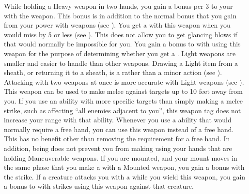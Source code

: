     While holding a Heavy weapon in two hands, you gain a  bonus per 3  to your  with the weapon.
    This bonus is in addition to the normal bonus that you gain from your power with weapons (see ).
     You get a  with this weapon when you would miss by 5 or less (see ).
    This does not allow you to get glancing blows if that would normally be impossible for you.
     You gain a  bonus to  with  using this weapon for the purpose of determining whether you get a .
     Light weapons are smaller and easier to handle than other weapons.
    Drawing a Light item from a sheath, or returning it to a sheath, is a  rather than a minor action (see ).
    Attacking with two weapons at once is more accurate with Light weapons (see ).
    \label{Long Weapon} This weapon can be used to make melee  against targets up to 10 feet away from you.
    If you use an ability with more specific targets than simply making a melee strike, such as affecting ``all enemies adjacent to you'', this weapon tag does not increase your range with that ability.
     Whenever you use a \atBrawling ability that would normally require a free hand, you can use this weapon instead of a free hand.
    This has no benefit other than removing the requirement for a free hand.
    In addition, being \grappled does not prevent you from making  using your hands that are holding Maneuverable weapons.
    \label{Mounted Weapon} If you are mounted, and your mount moves in the same phase that you make a  with a Mounted weapon, you gain a   bonus with the strike.
     If a creature attacks you with a   while you wield this weapon, you  gain a  bonus to  with strikes using this weapon against that creature.
